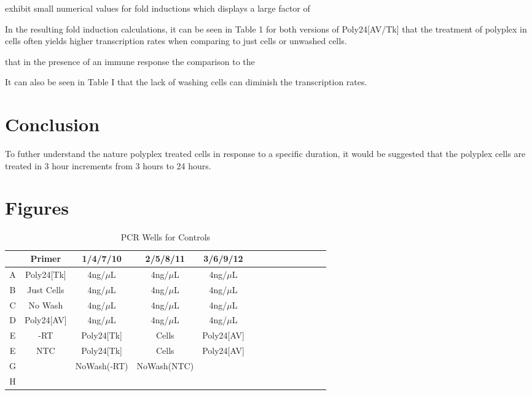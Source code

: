 \documentclass[journal, a4paper]{IEEEtran}
\begin{document}
exhibit small numerical values for fold inductions which displays a large factor of

In the resulting fold induction calculations, it can be seen in Table 1
for both versions of Poly24[AV/Tk] that the treatment of polyplex in cells
often yields higher transcription rates when comparing to just cells or unwashed cells.

that in
the presence of an immune response the
comparison
to the

It can also be seen in Table I that the lack of washing cells
can diminish the transcription rates.

\section{Conclusion}

To futher understand the nature polyplex treated cells in response to a specific duration,
it would be suggested that the polyplex cells are treated in 3 hour increments from 3 hours to 24 hours.


\section{Figures}

  \begin{table}[!hbt]
    \begin{center}
    \caption{PCR Wells for Controls}
    \label{tab:simParameters}
    \begin{tabular}{|c|c|c|c|c|c|c|c|c|c|c|c|c|c|}
      \hline
      & Primer & 1/4/7/10 & 2/5/8/11 & 3/6/9/12 \\
      \hline
      A & Poly24[Tk] & 4ng/$\mu$L & 4ng/$\mu$L & 4ng/$\mu$L\\
      \hline
      B & Just Cells & 4ng/$\mu$L & 4ng/$\mu$L & 4ng/$\mu$L\\
      \hline
      C & No Wash & 4ng/$\mu$L & 4ng/$\mu$L & 4ng/$\mu$L\\
      \hline
      D & Poly24[AV] & 4ng/$\mu$L & 4ng/$\mu$L & 4ng/$\mu$L\\
      \hline
      E & -RT & Poly24[Tk] & Cells & Poly24[AV] \\
      \hline
      E & NTC & Poly24[Tk] & Cells & Poly24[AV] \\
      \hline
      G & & NoWash(-RT) & NoWash(NTC) &\\
      \hline
      H & & & &\\
      \hline
    \end{tabular}
    \end{center}
  \end{table}
\end{document}
